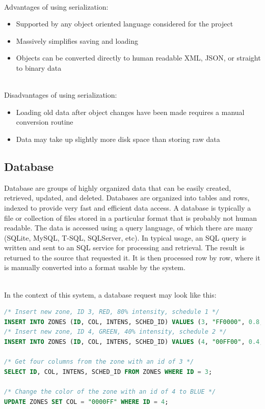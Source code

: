 \documentclass[onecolumn, draftclsnofoot,10pt, compsoc]{IEEEtran}
\begin{document}
		\noindent \\Advantages of using serialization:
		\begin{itemize}
			\item Supported by any object oriented language considered for the project
			\item Massively simplifies saving and loading
			\item Objects can be converted directly to human readable XML, JSON, or straight to binary data
		\end{itemize}

		\noindent \\Disadvantages of using serialization:
		\begin{itemize}
			\item Loading old data after object changes have been made requires a manual conversion routine
			\item Data may take up slightly more disk space than storing raw data
		\end{itemize}


		\subsection{Database}
		Database are groups of highly organized data that can be easily created, retrieved, updated, and deleted. \cite{database1}
		Databases are organized into tables and rows, indexed to provide very fast and efficient data access.
		A database is typically a file or collection of files stored in a particular format that is probably not human readable.
		The data is accessed using a query language, of which there are many (SQLite, MySQL, T-SQL, SQLServer, etc).
		In typical usage, an SQL query is written and sent to an SQL service for processing and retrieval.
		The result is returned to the source that requested it.
		It is then processed row by row, where it is manually converted into a format usable by the system.

		\noindent \\In the context of this system, a database request may look like this:
		\begin{lstlisting}[language=SQL]
/* Insert new zone, ID 3, RED, 80% intensity, schedule 1 */
INSERT INTO ZONES (ID, COL, INTENS, SCHED_ID) VALUES (3, "FF0000", 0.8, 1);
/* Insert new zone, ID 4, GREEN, 40% intensity, schedule 2 */
INSERT INTO ZONES (ID, COL, INTENS, SCHED_ID) VALUES (4, "00FF00", 0.4, 2);

/* Get four columns from the zone with an id of 3 */
SELECT ID, COL, INTENS, SCHED_ID FROM ZONES WHERE ID = 3;

/* Change the color of the zone with an id of 4 to BLUE */
UPDATE ZONES SET COL = "0000FF" WHERE ID = 4;
\end{lstlisting}
\end{document}
